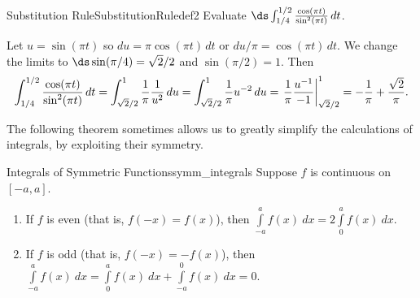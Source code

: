 \begin{solution}
{%
%
}
\end{solution}


\begin{example}{Substitution Rule}{SubstitutionRuledef2}
Evaluate $\ds\int_{1/4}^{1/2}{\cos(\pi t)\over\sin^2(\pi t)}\,dt$. 
\end{example}

\begin{solution} 
Let $u=\sin(\pi t)$ so $du=\pi\cos(\pi t)\,dt$ or $du/\pi=\cos(\pi
t)\,dt$.
We change the limits to $\ds \sin(\pi/4)=\sqrt2/2$ and 
$\sin(\pi/2)=1$.
Then
$$
  \int_{1/4}^{1/2}{\cos(\pi t)\over\sin^2(\pi t)}\,dt=
  \int_{\sqrt2/2}^{1}{1\over \pi}{1\over u^2}\,du=
  \int_{\sqrt2/2}^{1} {1\over \pi}u^{-2}\,du=
  \left.{1\over \pi}{u^{-1}\over -1}\right|_{\sqrt2/2}^{1}=
  -{1\over\pi}+{\sqrt2\over\pi}.
$$
\end{solution}

The following theorem sometimes allows us to greatly simplify the calculations of integrals, by exploiting their symmetry.

\begin{theorem}{Integrals of Symmetric Functions}{symm_integrals}
Suppose $f$ is continuous on $[-a, a]$.
\begin{enumerate}
\item  If $f$ is  even  (that is,  {$f(-x) = f(x)$}), then $\displaystyle  { \int\limits_{-a}^a f(x) \ dx} = 2  {\int\limits_0^a f(x) \ dx}$.
\item  If $f$ is  {odd} (that is,  {$f(-x) = -f(x)$}), then $\displaystyle   {\int\limits_{-a}^a f(x) \  dx }=  {\int\limits_{0}^a f(x) \ dx}+  {\int\limits_{-a}^0 f(x) \ dx}= 0$.
\end{enumerate}
\end{theorem}


